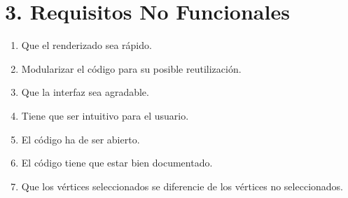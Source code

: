 \section*{3. Requisitos No Funcionales}


\begin{enumerate}[label=\textbf{\textit{RNF-\arabic*}}]
	\item Que el renderizado sea rápido.
	\item Modularizar el código para su posible reutilización.
	\item Que la interfaz sea agradable.
	\item Tiene que ser intuitivo para el usuario.
	\item El código ha de ser abierto.
	\item El código tiene que estar bien documentado.
	\item Que los vértices seleccionados se diferencie de los vértices no seleccionados.
	
	
	
\end{enumerate}
